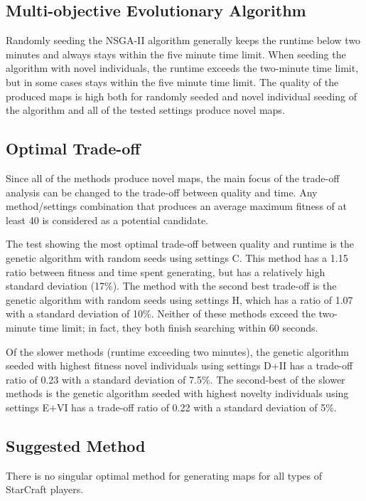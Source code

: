 \subsection{Multi-objective Evolutionary Algorithm}
\label{discussion_comparison_moea}
Randomly seeding the NSGA-II algorithm generally keeps the runtime below two minutes and always stays within the five minute time limit. When seeding the algorithm with novel individuals, the runtime exceeds the two-minute time limit, but in some cases stays within the five minute time limit. The quality of the produced maps is high both for randomly seeded and novel individual seeding of the algorithm and all of the tested settings produce novel maps.

\subsection{Optimal Trade-off}
\label{discussion_comparison_tradeoff}
Since all of the methods produce novel maps, the main focus of the trade-off analysis can be changed to the trade-off between quality and time. Any method/settings combination that produces an average maximum fitness of at least 40 is considered as a potential candidate.

The test showing the most optimal trade-off between quality and runtime is the genetic algorithm with random seeds using settings C. This method has a 1.15 ratio between fitness and time spent generating, but has a relatively high standard deviation (17\%). The method with the second best trade-off is the genetic algorithm with random seeds using settings H, which has a ratio of 1.07 with a standard deviation of 10\%. Neither of these methods exceed the two-minute time limit; in fact, they both finish searching within 60 seconds.

Of the slower methods (runtime exceeding two minutes), the genetic algorithm seeded with highest fitness novel individuals using settings D+II has a trade-off ratio of 0.23 with a standard deviation of 7.5\%. The second-best of the slower methods is the genetic algorithm seeded with highest novelty individuals using settings E+VI has a trade-off ratio of 0.22 with a standard deviation of 5\%.

\subsection{Suggested Method}
\label{discussion_comparison_suggestedmethod}
There is no singular optimal method for generating maps for all types of StarCraft players. 

